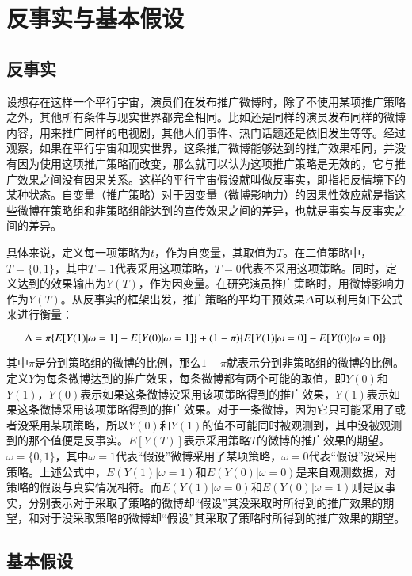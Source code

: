 \section{反事实与基本假设}
\subsection{反事实}
设想存在这样一个平行宇宙，演员们在发布推广微博时，除了不使用某项推广策略之外，其他所有条件与现实世界都完全相同。比如还是同样的演员发布同样的微博内容，用来推广同样的电视剧，其他人们事件、热门话题还是依旧发生等等。经过观察，如果在平行宇宙和现实世界，这条推广微博能够达到的推广效果相同，并没有因为使用这项推广策略而改变，那么就可以认为这项推广策略是无效的，它与推广效果之间没有因果关系。这样的平行宇宙假设就叫做反事实，即指相反情境下的某种状态\cite{胡安宁2012倾向值匹配与因果推论}。自变量（推广策略）对于因变量（微博影响力）的因果性效应就是指这些微博在策略组和非策略组能达到的宣传效果之间的差异，也就是事实与反事实之间的差异。

具体来说，定义每一项策略为$t$，作为自变量，其取值为$T$。在二值策略中，$T=\{0,1\}$，其中$T=1$代表采用这项策略，$T=0$代表不采用这项策略。同时，定义达到的效果输出为$Y(T)$，作为因变量。在研究演员推广策略时，用微博影响力作为$Y(T)$。从反事实的框架出发，推广策略的平均干预效果$\Delta$可以利用如下公式来进行衡量：

\begin{equation}
\Delta =\pi\{E[Y(1)|\omega=1]-E[Y(0)|\omega=1]\}+(1-\pi)\{E[Y(1)|\omega=0]-E[Y(0)|\omega=0]\}\\
\label{equ}
\end{equation}

其中$\pi$是分到策略组的微博的比例，那么$1-\pi$就表示分到非策略组的微博的比例。定义$Y$为每条微博达到的推广效果，每条微博都有两个可能的取值，即$Y(0)$和$Y(1)$，$Y(0)$表示如果这条微博没采用该项策略得到的推广效果，$Y(1)$表示如果这条微博采用该项策略得到的推广效果。对于一条微博，因为它只可能采用了或者没采用某项策略，所以$Y(0)$和$Y(1)$的值不可能同时被观测到，其中没被观测到的那个值便是反事实。$E[Y(T)]$表示采用策略$T$的微博的推广效果的期望。$\omega=\{0,1\}$，其中$\omega=1$代表“假设”微博采用了某项策略，$\omega=0$代表“假设”没采用策略。上述公式中，$E(Y(1)|\omega=1)$和$E(Y(0)|\omega=0)$是来自观测数据，对策略的假设与真实情况相符。而$E(Y(1)|\omega=0)$和$E(Y(0)|\omega=1)$则是反事实，分别表示对于采取了策略的微博却“假设”其没采取时所得到的推广效果的期望，和对于没采取策略的微博却“假设”其采取了策略时所得到的推广效果的期望。

\subsection{基本假设}

